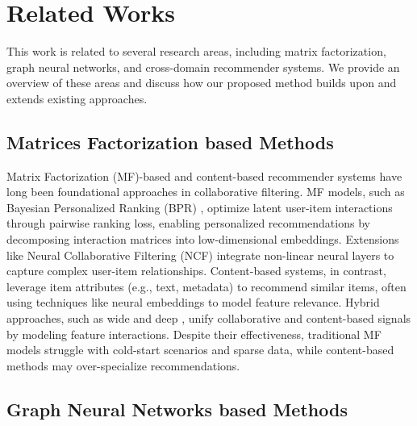 
\section{Related Works}

This work is related to several research areas, including matrix factorization, graph neural networks, and cross-domain recommender systems. We provide an overview of these areas and discuss how our proposed method builds upon and extends existing approaches.

\subsection{Matrices Factorization based Methods}
Matrix Factorization (MF)-based and content-based recommender systems have long been foundational approaches in collaborative filtering. MF models, such as Bayesian Personalized Ranking (BPR) \cite{rendle2012bpr}, optimize latent user-item interactions through pairwise ranking loss, enabling personalized recommendations by decomposing interaction matrices into low-dimensional embeddings.
Extensions like Neural Collaborative Filtering (NCF) \cite{he2017neural} integrate non-linear neural layers to capture complex user-item relationships.
Content-based systems, in contrast, leverage item attributes (e.g., text, metadata) to recommend similar items, often using techniques like neural embeddings to model feature relevance. Hybrid approaches, such as wide and deep \cite{cheng2016wide}, unify collaborative and content-based signals by modeling feature interactions. Despite their effectiveness, traditional MF models struggle with cold-start scenarios and sparse data, while content-based methods may over-specialize recommendations.

\subsection{Graph Neural Networks based Methods}

